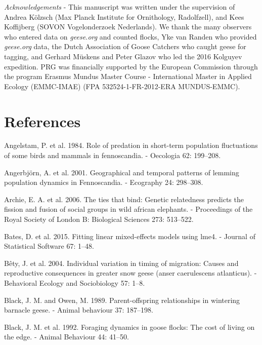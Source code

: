 \documentclass[10pt,twocolumn]{paper}
\begin{document}
\emph{Acknowledgements} - This manuscript was written under the
supervision of Andrea Kölzsch (Max Planck Institute for Ornithology,
Radolfzell), and Kees Koffijberg (SOVON Vogelonderzoek Nederlands). We
thank the many observers who entered data on \emph{geese.org} and
counted flocks, Yke van Randen who provided \emph{geese.org} data, the
Dutch Association of Goose Catchers who caught geese for tagging, and
Gerhard Müskens and Peter Glazov who led the 2016 Kolguyev expedition.
PRG was financially supported by the European Commission through the
program Erasmus Mundus Master Course - International Master in Applied
Ecology (EMMC-IMAE) (FPA 532524-1-FR-2012-ERA MUNDUS-EMMC).

\section{References}\label{references}

\hypertarget{refs}{}
\hypertarget{ref-angelstam1984role}{}
Angelstam, P. et al. 1984. Role of predation in short-term population
fluctuations of some birds and mammals in fennoscandia. - Oecologia 62:
199--208.

\hypertarget{ref-angerbjorn2001geographical}{}
Angerbjörn, A. et al. 2001. Geographical and temporal patterns of
lemming population dynamics in Fennoscandia. - Ecography 24: 298--308.

\hypertarget{ref-Archie513}{}
Archie, E. A. et al. 2006. The ties that bind: Genetic relatedness
predicts the fission and fusion of social groups in wild african
elephants. - Proceedings of the Royal Society of London B: Biological
Sciences 273: 513--522.

\hypertarget{ref-lme4}{}
Bates, D. et al. 2015. Fitting linear mixed-effects models using lme4. -
Journal of Statistical Software 67: 1--48.

\hypertarget{ref-Buxeaty2004}{}
Bêty, J. et al. 2004. Individual variation in timing of migration:
Causes and reproductive consequences in greater snow geese (anser
caerulescens atlanticus). - Behavioral Ecology and Sociobiology 57:
1--8.

\hypertarget{ref-black1989parent}{}
Black, J. M. and Owen, M. 1989. Parent-offspring relationships in
wintering barnacle geese. - Animal behaviour 37: 187--198.

\hypertarget{ref-black1992foraging}{}
Black, J. M. et al. 1992. Foraging dynamics in goose flocks: The cost of
living on the edge. - Animal Behaviour 44: 41--50.
\end{document}
